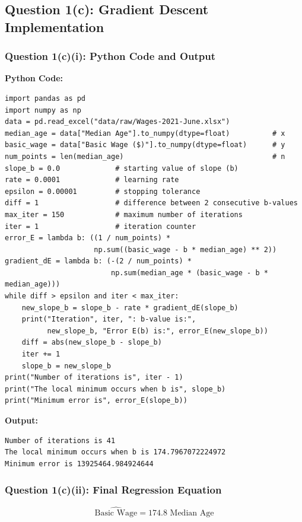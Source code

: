 \documentclass[12pt,a4paper,oneside]{report}
\begin{document}
\subsection{Question 1(c): Gradient Descent Implementation}

\subsubsection{Question 1(c)(i): Python Code and Output}

\textbf{Python Code:}
\begin{verbatim}
import pandas as pd
import numpy as np
data = pd.read_excel("data/raw/Wages-2021-June.xlsx")
median_age = data["Median Age"].to_numpy(dtype=float)          # x
basic_wage = data["Basic Wage ($)"].to_numpy(dtype=float)      # y
num_points = len(median_age)                                   # n
slope_b = 0.0             # starting value of slope (b)
rate = 0.0001             # learning rate
epsilon = 0.00001         # stopping tolerance
diff = 1                  # difference between 2 consecutive b-values
max_iter = 150            # maximum number of iterations
iter = 1                  # iteration counter
error_E = lambda b: ((1 / num_points) *
                     np.sum((basic_wage - b * median_age) ** 2))
gradient_dE = lambda b: (-(2 / num_points) *
                         np.sum(median_age * (basic_wage - b * median_age)))
while diff > epsilon and iter < max_iter:
    new_slope_b = slope_b - rate * gradient_dE(slope_b)
    print("Iteration", iter, ": b-value is:",
          new_slope_b, "Error E(b) is:", error_E(new_slope_b))
    diff = abs(new_slope_b - slope_b)
    iter += 1
    slope_b = new_slope_b
print("Number of iterations is", iter - 1)
print("The local minimum occurs when b is", slope_b)
print("Minimum error is", error_E(slope_b))
\end{verbatim}
\textbf{Output:}
\begin{verbatim}
Number of iterations is 41
The local minimum occurs when b is 174.7967072224972
Minimum error is 13925464.984924644
\end{verbatim}

\subsubsection{Question 1(c)(ii): Final Regression Equation}

\[
\widehat{\text{Basic Wage}} = 174.8 \text{ Median Age}
\]
\end{document}
